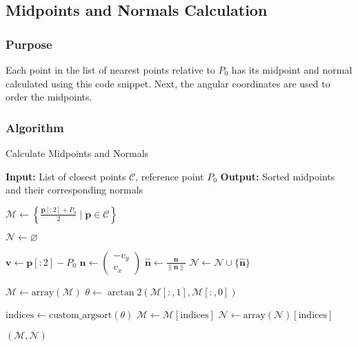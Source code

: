 \documentclass[12pt,a4paper]{report}
\begin{document}
\subsection{Midpoints and Normals Calculation}

\subsubsection{Purpose}
Each point in the list of nearest points relative to \(P_0\) has its midpoint and normal calculated using this code snippet. Next, the angular coordinates are used to order the midpoints.


\subsubsection{Algorithm}

\begin{algorithm}
\caption{Calculate Midpoints and Normals}
\begin{algorithmic}[1]
\State \textbf{Input:} List of closest points $\mathcal{C}$, reference point $P_0$
\State \textbf{Output:} Sorted midpoints and their corresponding normals

\State $\mathcal{M} \gets \left\{ \frac{\mathbf{p}[:2] + P_0}{2} \mid \mathbf{p} \in \mathcal{C} \right\}$

\State $\mathcal{N} \gets \varnothing$

    \State $\mathbf{v} \gets \mathbf{p}[:2] - P_0$
    \State $\mathbf{n} \gets \begin{pmatrix} -v_y \\ v_x \end{pmatrix}$
    \State $\hat{\mathbf{n}} \gets \frac{\mathbf{n}}{\|\mathbf{n}\|}$
    \State $\mathcal{N} \gets \mathcal{N} \cup \{\hat{\mathbf{n}}\}$
\EndFor

\State $\mathcal{M} \gets \text{array}(\mathcal{M})$
\State $\theta \gets \arctan2(\mathcal{M}[:, 1], \mathcal{M}[:, 0])$

\State $\text{indices} \gets \text{custom\_argsort}(\theta)$
\State $\mathcal{M} \gets \mathcal{M}[\text{indices}]$
\State $\mathcal{N} \gets \text{array}(\mathcal{N})[\text{indices}]$

\State \Return $(\mathcal{M}, \mathcal{N})$
\end{algorithmic}
\end{algorithm}
\end{document}

